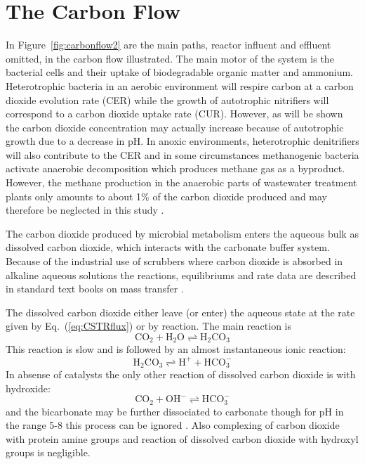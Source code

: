 \section{The Carbon Flow}
In Figure~\ref{fig:carbonflow2} are the main paths, reactor influent and effluent omitted, in the carbon flow illustrated. The main motor of the system is the bacterial cells and their uptake of biodegradable organic matter and ammonium. Heterotrophic bacteria in an aerobic environment will respire carbon at a carbon dioxide evolution rate (CER) while the growth of autotrophic nitrifiers will correspond to a carbon dioxide uptake rate (CUR). However, as will be shown the carbon dioxide concentration may actually increase because of autotrophic growth due to a decrease in pH. In anoxic environments, heterotrophic denitrifiers will also contribute to the CER and in some circumstances methanogenic bacteria activate anaerobic decomposition which produces methane gas as a byproduct. However, the methane production in the anaerobic parts of wastewater treatment plants only amounts to about 1\% of the carbon dioxide produced and may therefore be neglected in this study \cite{CCH:MEM:93}.


The carbon dioxide produced by microbial metabolism enters the aqueous bulk as dissolved carbon dioxide, which interacts with the carbonate buffer system. Because of the industrial use of scrubbers where carbon dioxide is absorbed in alkaline aqueous solutions the reactions, equilibriums and rate data are described in standard text books on mass transfer \cite{Ast:MTC:67,SPW:MT:75}.

The dissolved carbon dioxide either leave (or enter) the aqueous state at the rate given by Eq.~(\ref{eq:CSTRflux}) or by reaction. The main reaction is
\begin{equation}\label{eq:CO21}
\mbox{CO}_2+\mbox{H}_2\mbox{O} \rightleftharpoons \mbox{H}_2\mbox{CO}_3
\end{equation}
This reaction is slow and is followed by an almost instantaneous ionic reaction:
\begin{equation}\label{eq:CO22}
\mbox{H}_2\mbox{CO}_3\rightleftharpoons\mbox{H}^+ +\mbox{HCO}_3^-
\end{equation}
In absense of catalysts the only other reaction of dissolved carbon dioxide is with hydroxide:
\begin{equation}\label{eq:CO23}
\mbox{CO}_2+\mbox{OH}^- \rightleftharpoons \mbox{HCO}_3^-
\end{equation}
and the bicarbonate may be further dissociated to carbonate though for pH in the range 5-8 this process can be ignored \cite{SPW:MT:75}. Also complexing of carbon dioxide with protein amine groups and reaction of dissolved carbon dioxide with hydroxyl groups is negligible.

